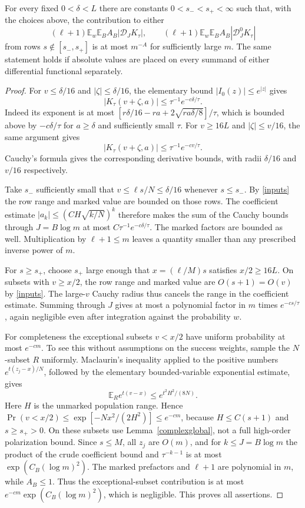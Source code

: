 \documentclass[11pt]{article}
\newcommand{\E}{\mathbb E}
\begin{document}
\begin{theorem}\label{outside}
For every fixed $0<\delta<L$ there are constants $0<s_-<s_+<\infty$
such that, with the choices above, the contribution to either
\[
 (\ell+1)\E_w\E_B A_B|\mathcal D_JK_\tau|,
 \qquad
 (\ell+1)\E_w\E_B A_B|\mathcal D_J^0K_\tau|
\]
from rows $s\notin[s_-,s_+]$ is at most $m^{-A}$ for sufficiently
large $m$. The same statement holds if absolute values are placed on
every summand of either differential functional separately.
\end{theorem}
\begin{proof}
For $v\le\delta/16$ and $|\zeta|\le\delta/16$, the elementary bound
$|I_0(z)|\le e^{|z|}$ gives
\[
 |K_\tau(v+\zeta,a)|\le\tau^{-1}e^{-c\delta/\tau}.
\]
Indeed its exponent is at most
$[r\delta/16-ra+2\sqrt{ra\delta/8}]/\tau$, which is bounded above
by $-c\delta/\tau$ for $a\ge\delta$ and sufficiently small $\tau$.
For $v\ge16L$ and $|\zeta|\le v/16$, the same argument gives
\[
 |K_\tau(v+\zeta,a)|\le\tau^{-1}e^{-cv/\tau}.
\]
Cauchy's formula gives the corresponding derivative bounds, with
radii $\delta/16$ and $v/16$ respectively.

Take $s_-$ sufficiently small that $v\le\ell s/N\le\delta/16$
whenever $s\le s_-$. By \eqref{inputs} the row range and marked
value are bounded on those rows. The coefficient estimate
$|a_k|\le(CH\sqrt{k/N})^k$ therefore makes the sum of the Cauchy
bounds through $J=B\log m$ at most
$C\tau^{-1}e^{-c\delta/\tau}$. The marked factors are bounded as
well. Multiplication by $\ell+1\le m$ leaves a quantity smaller than
any prescribed inverse power of $m$.

For $s\ge s_+$, choose $s_+$ large enough that
$x=(\ell/M)s$ satisfies $x/2\ge16L$.
On subsets with $v\ge x/2$, the row range and marked value are
$O(s+1)=O(v)$ by \eqref{inputs}. The large-$v$ Cauchy radius thus
cancels the range in the coefficient estimate. Summing through $J$
gives at most a polynomial factor in $m$ times $e^{-cs/\tau}$,
again negligible even after integration against the probability $w$.

For completeness the exceptional subsets $v<x/2$ have uniform
probability at most $e^{-cm}$. To see this without assumptions on the
success weights, sample the $N$-subset $R$ uniformly. Maclaurin's
inequality applied to the positive numbers $e^{t(z_j-x)/N}$, followed
by the elementary bounded-variable exponential estimate, gives
\[
 \E_R e^{t(v-x)}\le e^{t^2H^2/(8N)}.
\]
Here $H$ is the unmarked population range. Hence
$\Pr(v<x/2)\le\exp[-Nx^2/(2H^2)]\le e^{-cm}$, because
$H\le C(s+1)$ and $s\ge s_+>0$.
On these subsets use Lemma~\ref{complexglobal}, not a full
high-order polarization bound. Since $s\le M$, all $z_j$ are
$O(m)$, and for $k\le J=B\log m$ the product of the crude coefficient
bound and $\tau^{-k-1}$ is at most $\exp(C_B(\log m)^2)$.
The marked prefactors and $\ell+1$ are polynomial in $m$, while
$A_B\le1$. Thus the exceptional-subset contribution is at most
$e^{-cm}\exp(C_B(\log m)^2)$, which is negligible. This proves all
assertions.
\end{proof}
\end{document}
